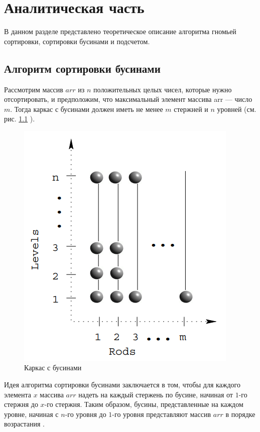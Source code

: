 \chapter{Аналитическая часть}

В данном разделе представлено теоретическое описание алгоритма гномьей сортировки, сортировки бусинами и подсчетом.

\section{Алгоритм сортировки бусинами}

Рассмотрим массив $arr$ из $n$ положительных целых чисел, которые нужно отсортировать, и предположим, что максимальный элемент массива arr --- число $m$. Тогда каркас с бусинами должен иметь не менее $m$ стержней и $n$ уровней (см. рис. \ref{img:bead_sort_fig} \cite{bead_sort}). 

\begin{figure}[H]
	\begin{center}
		\includegraphics[scale=0.7]{img/bead_sort_fig.png}
	\end{center}
	\captionsetup{justification=centering}
	\caption{Каркас с бусинами}
	\label{img:bead_sort_fig}
\end{figure}

Идея алгоритма сортировки бусинами заключается в том, чтобы для каждого элемента $x$ массива $arr$ надеть на каждый стержень по бусине, начиная от $1$-го стержня до $x$-го стержня. Таким образом, бусины, представленные на каждом уровне, начиная с $n$-го уровня до $1$-го уровня представляют массив $arr$ в порядке возрастания \cite{bead_sort}.

